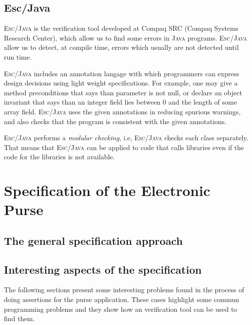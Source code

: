 \documentclass[a4paper]{llncs}
\begin{document}
\subsection{\sc Esc/Java}
\label{SubSectEscJava}
\textsc{Esc/Java} is the verification tool developed at
Compaq SRC (Compaq Systems Research Center), which allow us to find
some errors in \textsc{Java} programs. \textsc{Esc/Java} allow us to
detect, at compile time, errors which usually are not detected until
run time. 

\textsc{Esc/Java} includes an annotation langage with which
programmers can express design decisions using light weight
specifications. For example, one may give a method preconditions that
says than parameter is not null, or declare an object invariant that
says than an integer field lies between $0$ and the length of some
array field. \textsc{Esc/Java} uses the given annotations in reducing
spurious warnings, and also checks that the program is consistent with 
the given annotations. 

\textsc{Esc/Java} performs a \textit{modular checking}, i.e,
\textsc{Esc/Java} checks each class separately. That means that
\textsc{Esc/Java} can be applied to code that calls libraries even if
the code for the libraries is not available. 






\section{Specification of the Electronic Purse}
\label{SectSpecPurse}






\subsection{The general specification approach}






\subsection{Interesting aspects of the specification}
The following sections present some interesting problems found in the
process of doing assertions for the purse application. These cases
highlight some commun programming problems and they show how an
verification tool can be used to find them. 
\end{document}
